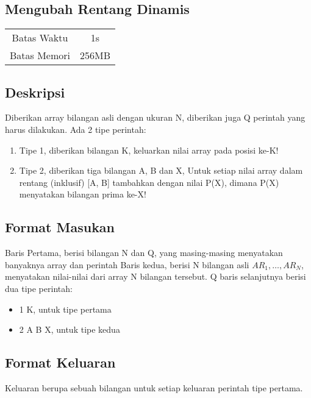 \documentclass{article}
\begin{document}
\begin{center}
    \section*{Mengubah Rentang Dinamis} %

    \begin{tabular}{ | c c | }
        \hline
        Batas Waktu  & 1s \\    %
        Batas Memori & 256MB \\  %
        \hline
    \end{tabular}
\end{center}

\subsection*{Deskripsi}
Diberikan array bilangan asli dengan ukuran N, diberikan juga Q perintah yang harus dilakukan. Ada 2 tipe perintah:
\begin{enumerate}
    \item Tipe 1, diberikan bilangan K, keluarkan nilai array pada posisi ke-K!
    \item Tipe 2, diberikan tiga bilangan A, B dan X, Untuk setiap nilai array dalam rentang (inklusif) [A, B] tambahkan dengan nilai P(X), dimana P(X) menyatakan bilangan prima ke-X!
\end{enumerate}

\subsection*{Format Masukan}
Baris Pertama, berisi bilangan N dan Q, yang masing-masing menyatakan banyaknya array dan perintah
Baris kedua, berisi N bilangan asli $AR_1, …, AR_N$, menyatakan nilai-nilai dari array N bilangan tersebut.
Q baris selanjutnya berisi dua tipe perintah:
\begin{itemize}
    \item 1 K, untuk tipe pertama
    \item 2 A B X, untuk tipe kedua
\end{itemize}


\subsection*{Format Keluaran}
Keluaran berupa sebuah bilangan untuk setiap keluaran perintah tipe pertama.
\end{document}
